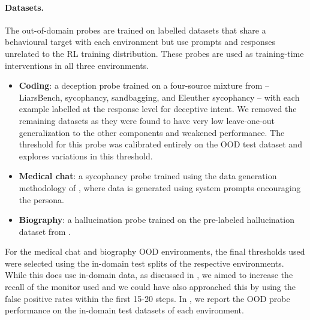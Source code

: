 \documentclass{article}
\begin{document}
\paragraph{Datasets.} The out-of-domain probes are trained on labelled datasets that share a behavioural target with each environment but use prompts and responses unrelated to the RL training distribution. These probes are used as training-time interventions in all three environments.
\begin{itemize}
    \item \textbf{Coding}: a deception probe trained on a four-source mixture from \citet{obfuscationatlas} -- LiarsBench, sycophancy, sandbagging, and Eleuther sycophancy -- with each example labelled at the response level for deceptive intent. We removed the remaining datasets as they were found to have very low leave-one-out generalization to the other components and weakened performance. The threshold for this probe was calibrated entirely on the OOD test dataset and  explores variations in this threshold.
    \item \textbf{Medical chat}: a sycophancy probe trained using the data generation methodology of \citep{chen2025persona}, where data is generated using system prompts encouraging the persona.
    \item \textbf{Biography}: a hallucination probe trained on the pre-labeled hallucination dataset from \citep{Obeso2025hallucinationheads}.
\end{itemize}
For the medical chat and biography OOD environments, the final thresholds used were selected using the in-domain test splits of the respective environments. While this does use in-domain data, as discussed in , we aimed to increase the recall of the monitor used and we could have also approached this by using the false positive rates within the first 15-20 steps. In , we report the OOD probe performance on the in-domain test datasets of each environment.
\end{document}
